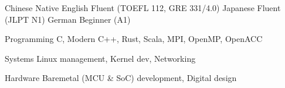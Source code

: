 
\begin{cvskills}

    \cvskill
    {Chinese}
    {Native}
    \cvskill
    {English}
    {Fluent (TOEFL 112, GRE 331/4.0)}
    \cvskill
    {Japanese}
    {Fluent (JLPT N1)}
    \cvskill
    {German}
    {Beginner (A1)}


\end{cvskills}


\begin{cvskills}

  \cvskill
    {Programming} %
    {C, Modern C++, Rust, Scala, MPI, OpenMP, OpenACC} %

  \cvskill
    {Systems} %
    {Linux management, Kernel dev, Networking} %

  \cvskill
    {Hardware}
    {Baremetal (MCU \& SoC) development, Digital design}

\end{cvskills}
